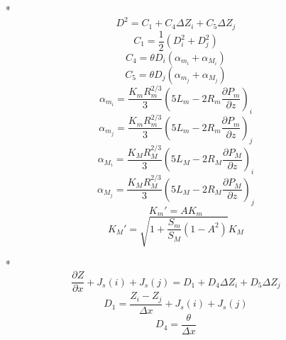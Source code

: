 \begin{itemize}
\begin{itemize}
 \item[*]
  \begin{equation}
   D^2 = C_1 + C_4 \Delta Z_i + C_5 \Delta Z_j
  \end{equation}
  \begin{equation}
   C_1 = \frac{1}{2} ( D_{i}^2 + D_{j}^2 )
  \end{equation}
  \begin{equation}
   C_4 = \theta D_i ( \alpha_{m_i} + \alpha_{M_i} )
  \end{equation}
  \begin{equation}
   C_5 = \theta D_j ( \alpha_{m_j} + \alpha_{M_j} )
  \end{equation}
  \begin{equation}
   \alpha_{m_i} = \frac{K_m R_{m}^{2/3}}{3} \left ( 5 L_m -2 R_m \frac{\partial P_m}{\partial z} \right )_i
  \end{equation}
   \begin{equation}
   \alpha_{m_j} = \frac{K_m R_{m}^{2/3}}{3} \left ( 5 L_m -2 R_m \frac{\partial P_m}{\partial z} \right )_j
  \end{equation}
  \begin{equation}
    \alpha_{M_i} = \frac{K_M R_{M}^{2/3}}{3} \left ( 5 L_M -2 R_M \frac{\partial P_M}{\partial z} \right )_i
  \end{equation}
  \begin{equation}
    \alpha_{M_j} = \frac{K_M R_{M}^{2/3}}{3} \left ( 5 L_M -2 R_M \frac{\partial P_M}{\partial z} \right )_j
  \end{equation}
  \begin{equation}
    K_{m}' = A K_m 
  \end{equation}
  \begin{equation}
    K_{M}' = \sqrt{1 + \frac{S_m}{S_M} (1-A^2)} K_M
  \end{equation}
 \item[*]
  \begin{equation}
    \frac{\partial Z}{\partial x} + J_{s}(i) + J_{s}(j) = D_1 + D_4 \Delta Z_i + D_5 \Delta Z_j
  \end{equation}
  \begin{equation}
     D_1 = \frac{Z_i - Z_j}{\Delta x} + J_{s}(i) + J_{s}(j)
  \end{equation}
  \begin{equation}
    D_4 = \frac{\theta}{\Delta x}
  \end{equation}
    \begin{equation}

\end{equation}
\end{itemize}
\end{itemize}
